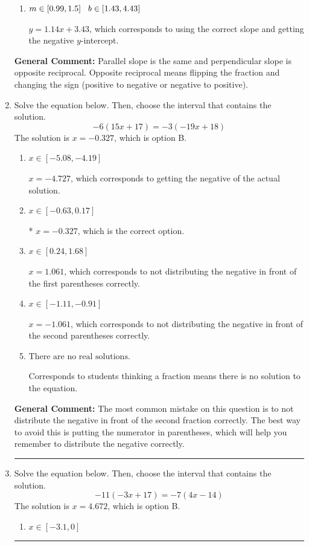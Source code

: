 \documentclass{extbook}[14pt]
\newcommand{\litem}[1]{\item #1

\rule{\textwidth}{0.4pt}}
\begin{document}
\begin{enumerate}
{\begin{enumerate}[label=\Alph*.]
 $y = -1.14x + 19.43$, which corresponds to using the negative slope.
\item \( m \in [0.99, 1.5] \hspace*{3mm} b \in [1.43, 4.43] \)

 $y = 1.14x + 3.43$, which corresponds to using the correct slope and getting the negative $y$-intercept.
\end{enumerate}

\textbf{General Comment:} Parallel slope is the same and perpendicular slope is opposite reciprocal. Opposite reciprocal means flipping the fraction and changing the sign (positive to negative or negative to positive).
}
\litem{
Solve the equation below. Then, choose the interval that contains the solution.
\[ -6(15x + 17) = -3(-19x + 18) \]The solution is \( x = -0.327 \), which is option B.\begin{enumerate}[label=\Alph*.]
\item \( x \in [-5.08, -4.19] \)

$x = -4.727$, which corresponds to getting the negative of the actual solution.
\item \( x \in [-0.63, 0.17] \)

* $x = -0.327$, which is the correct option.
\item \( x \in [0.24, 1.68] \)

$x = 1.061$, which corresponds to not distributing the negative in front of the first parentheses correctly.
\item \( x \in [-1.11, -0.91] \)

$x = -1.061$, which corresponds to not distributing the negative in front of the second parentheses correctly.
\item \( \text{There are no real solutions.} \)

Corresponds to students thinking a fraction means there is no solution to the equation.
\end{enumerate}

\textbf{General Comment:} The most common mistake on this question is to not distribute the negative in front of the second fraction correctly. The best way to avoid this is putting the numerator in parentheses, which will help you remember to distribute the negative correctly.
}
\litem{
Solve the equation below. Then, choose the interval that contains the solution.
\[ -11(-3x + 17) = -7(4x -14) \]The solution is \( x = 4.672 \), which is option B.\begin{enumerate}[label=\Alph*.]
\item \( x \in [-3.1, 0] \)


\end{enumerate}}
\end{enumerate}
\end{document}
